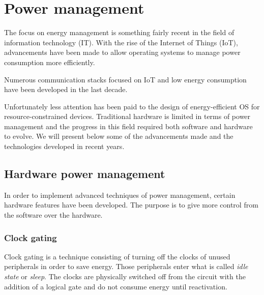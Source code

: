 \section{Power management}



The focus on energy management is something fairly recent in the field of information technology (IT).
With the rise of the Internet of Things (IoT), advancements have been made to allow operating systems to manage power consumption more efficiently.

Numerous communication stacks focused on IoT and low energy consumption have been developed in the last decade.

Unfortunately less attention has been paid to the design of energy-efficient OS for resource-constrained devices.
Traditional hardware is limited in terms of power management and the progress in this field required both software and hardware to evolve.
We will present below some of the advancements made and the technologies developed in recent years\cite{power-mgmt}.


\subsection{Hardware power management}
In order to implement advanced techniques of power management, certain hardware features have been developed.
The purpose is to give more control from the software over the hardware.

\subsubsection{Clock gating}
Clock gating is a technique consisting of turning off the clocks of unused peripherals in order to save energy.
Those peripherals enter what is called \textit{idle state} or \textit{sleep}.
The clocks are physically switched off from the circuit with the addition of a logical gate and do not consume energy until reactivation.

